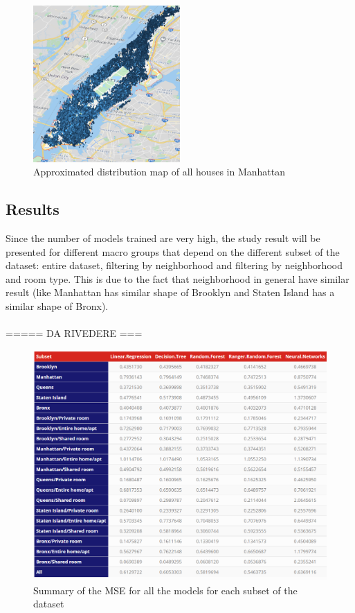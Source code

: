 \documentclass{FR16}
\begin{document}
\begin{figure}[H]
\centering
\includegraphics[width=0.5\textwidth]{figures/figure4.PNG} 
\caption{\label{fig:4}  Approximated distribution map of all houses in Manhattan }
\end{figure}






\newpage


\subsection{Results}

Since the number of models trained are very high, the study result will be presented for different macro groups that depend on the different subset of the dataset: entire dataset,  filtering by neighborhood and filtering by neighborhood and room type. This is due to the fact that neighborhood in general have similar result (like Manhattan has similar shape of Brooklyn and Staten Island has a similar shape of Bronx).\\\\
 =====
 DA RIVEDERE
 ===\\
\begin{figure}[H]
\centering
\includegraphics[width=1\textwidth]{figures/model_summary.PNG} 
\caption{\label{fig:5} Summary of the MSE for all the models for each subset of the dataset }
\end{figure}
\end{document}
